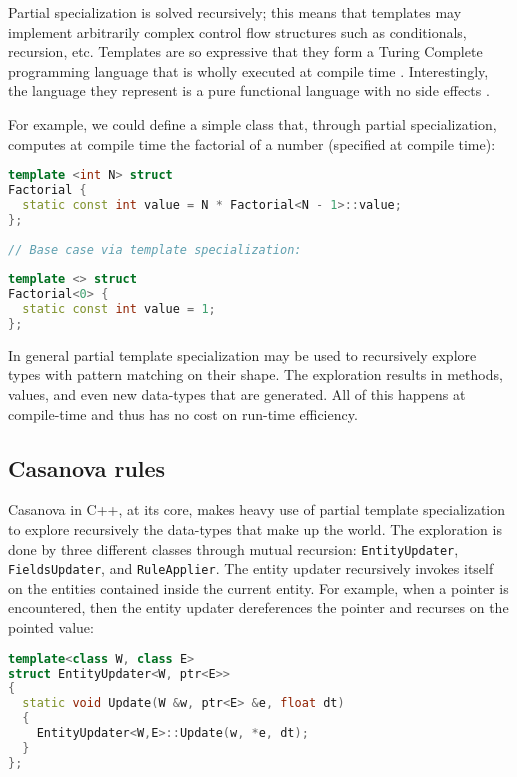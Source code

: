 Partial specialization is solved recursively; this means that templates may implement arbitrarily complex control flow structures such as conditionals, recursion, etc. Templates are so expressive that they form a Turing Complete programming language that is wholly executed at compile time \cite{APPENDIX_E_TEMPLATES_TURING_EQUIVALENCE}. Interestingly, the language they represent is a pure functional language with no side effects \cite{APPENDIX_E_TEMPLATES_ARE_PURE_FUNCTIONS}.

For example, we could define a simple class that, through partial specialization, computes at compile time the factorial of a number (specified at compile time):

\begin{lstlisting}[language=C++]
template <int N> struct 
Factorial {
  static const int value = N * Factorial<N - 1>::value;
};
 
// Base case via template specialization:
 
template <> struct 
Factorial<0> {
  static const int value = 1;
};
\end{lstlisting}

In general partial template specialization may be used to recursively explore types with pattern matching on their shape. The exploration results in methods, values, and even new data-types that are generated. All of this happens at compile-time and thus has no cost on run-time efficiency.


\subsection{Casanova rules}
Casanova in C++, at its core, makes heavy use of partial template specialization to explore recursively the data-types that make up the world. The exploration is done by three different classes through mutual recursion: \texttt{EntityUpdater}, \texttt{FieldsUpdater}, and \texttt{RuleApplier}. The entity updater recursively invokes itself on the entities contained inside the current entity. For example, when a pointer is encountered, then the entity updater dereferences the pointer and recurses on the pointed value:

\begin{lstlisting}[language=C++]
template<class W, class E>
struct EntityUpdater<W, ptr<E>>
{
  static void Update(W &w, ptr<E> &e, float dt) 
  {
    EntityUpdater<W,E>::Update(w, *e, dt);
  }
};
\end{lstlisting}

